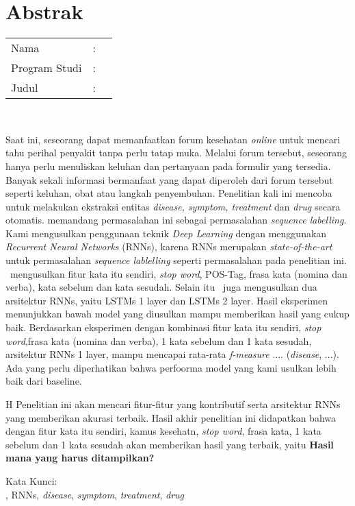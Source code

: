%
%
%

\chapter*{Abstrak}

\vspace*{0.2cm}

\noindent \begin{tabular}{l l p{10cm}}
	Nama&: & \penulis \\
	Program Studi&: & \program \\
	Judul&: & \judul \\
\end{tabular} \\ 

\vspace*{0.5cm}

\noindent
Saat ini, seseorang dapat memanfaatkan forum kesehatan \textit{online} untuk mencari tahu perihal penyakit tanpa perlu tatap muka.  Melalui forum tersebut, seseorang hanya perlu menuliskan keluhan dan pertanyaan pada formulir yang tersedia. Banyak sekali informasi bermanfaat yang dapat diperoleh dari forum tersebut seperti keluhan, obat atau langkah penyembuhan. Penelitian kali ini mencoba untuk melakukan ekstraksi entitas \textit{disease, symptom, treatment} dan \textit{drug} secara otomatis. \Saya memandang permasalahan ini sebagai permasalahan \textit{sequence labelling}. Kami mengusulkan penggunaan teknik \textit{Deep Learning} dengan menggunakan \textit{Recurrent Neural Networks} (RNNs), karena RNNs merupakan \textit{state-of-the-art} untuk permasalahan \textit{sequence lablelling} seperti permasalahan pada penelitian ini. \Saya~mengusulkan fitur kata itu sendiri, \textit{stop word}, POS-Tag, frasa kata (nomina dan verba), kata sebelum dan kata sesudah. Selain itu \saya~juga mengusulkan dua arsitektur RNNs, yaitu LSTMs 1 layer dan LSTMs 2 layer. Hasil eksperimen menunjukkan bawah model yang diusulkan mampu memberikan hasil yang cukup baik. Berdasarkan eksperimen dengan kombinasi fitur kata itu sendiri, \textit{stop word},frasa kata (nomina dan verba), 1 kata sebelum dan 1 kata sesudah, arsitektur RNNs 1 layer, mampu mencapai rata-rata \textit{f-measure} .... (\textit{disease}, ...).
Ada yang perlu diperhatikan bahwa perfoorma model yang kami usulkan lebih baik dari baseline.

H Penelitian ini akan mencari fitur-fitur yang kontributif serta arsitektur RNNs yang memberikan akurasi terbaik. Hasil akhir penelitian ini didapatkan bahwa dengan fitur kata itu sendiri, kamus kesehatn, \textit{stop word}, frasa kata, 1 kata sebelum dan 1 kata sesudah akan memberikan hasil yang terbaik, yaitu \textbf{Hasil mana yang harus ditampilkan?}


\vspace*{0.2cm}

\noindent Kata Kunci: \\ 
\noindent \mer, RNNs, \textit{disease}, \textit{symptom}, \textit{treatment}, \textit{drug} \\ 

\newpage